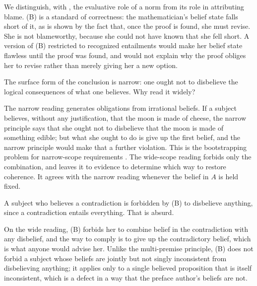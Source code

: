 \documentclass{situationist-preprint}
\begin{document}
\begin{reply}
We distinguish, with \citet{Steinberger2019}, the evaluative role of a norm from its role in attributing blame. (B) is a standard of correctness: the mathematician's belief state falls short of it, as is shown by the fact that, once the proof is found, she must revise. She is not blameworthy, because she could not have known that she fell short. A version of (B) restricted to recognized entailments would make her belief state flawless until the proof was found, and would not explain why the proof obliges her to revise rather than merely giving her a new option.
\end{reply}

\begin{objection}[Scope]\label{o:scope}
The surface form of the conclusion is narrow: one ought not to disbelieve the logical consequences of what one believes. Why read it widely?
\end{objection}

\begin{reply}
The narrow reading generates obligations from irrational beliefs. If a subject believes, without any justification, that the moon is made of cheese, the narrow principle says that she ought not to disbelieve that the moon is made of something edible; but what she ought to do is give up the first belief, and the narrow principle would make that a further violation. This is the bootstrapping problem for narrow-scope requirements \citep{Broome2013}. The wide-scope reading forbids only the combination, and leaves it to evidence to determine which way to restore coherence. It agrees with the narrow reading whenever the belief in $A$ is held fixed.
\end{reply}

\begin{objection}
A subject who believes a contradiction is forbidden by (B) to disbelieve anything, since a contradiction entails everything. That is absurd.
\end{objection}

\begin{reply}
On the wide reading, (B) forbids her to combine belief in the contradiction with any disbelief, and the way to comply is to give up the contradictory belief, which is what anyone would advise her. Unlike the multi-premise principle, (B) does not forbid a subject whose beliefs are jointly but not singly inconsistent from disbelieving anything; it applies only to a single believed proposition that is itself inconsistent, which is a defect in a way that the preface author's beliefs are not.
\end{reply}
\end{document}
